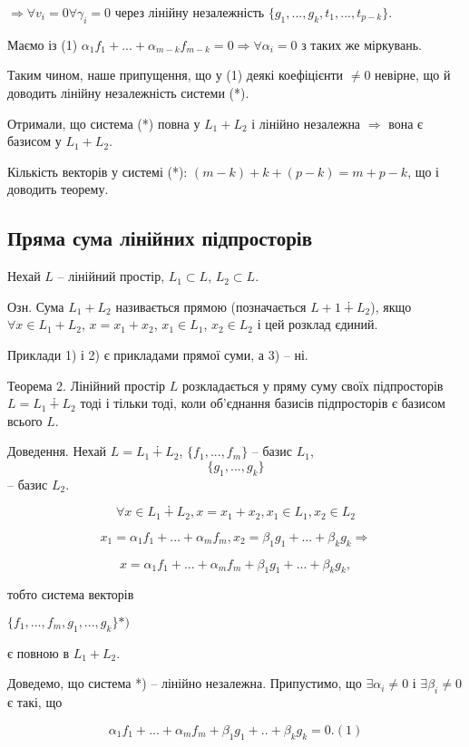 $\Rightarrow \forall v_i = 0 \forall \gamma_i = 0$
через лінійну незалежність $\{g_1, ..., g_k, t_1, ..., t_{p-k}\}$.

Маємо із (1) $\alpha_1 f_1 + ... + \alpha_{m-k} f_{m-k} = 0 \Rightarrow \forall \alpha_i = 0$ з
таких же міркувань.

Таким чином, наше припущення, що у (1) деякі коефіцієнти $\neq 0$ невірне,
що й доводить лінійну незалежність системи (*).

Отримали, що система (*) повна у $L_1 + L_2$ і лінійно незалежна $\Rightarrow$ вона є
базисом у $L_1 + L_2$.


Кількість векторів у системі (*): $(m - k) + k + (p - k) = m + p - k$,
що і доводить теорему. 

\subsection*{Пряма сума лінійних підпросторів}

Нехай $L$ -- лінійний простір, $L_1 \subset L$, $L_2 \subset L$.

Озн. Сума $L_1 + L_2$ називається прямою (позначається $L+1 \dotplus L_2$), якщо
$\forall x \in L_1 + L_2$, $x = x_1 + x_2$, $x_1 \in L_1$, $x_2 \in L_2$ і цей розклад єдиний.

Приклади 1) і 2) є прикладами прямої суми, а 3) -- ні.

Теорема 2. Лінійний простір $L$ розкладається у пряму суму своїх
підпросторів $L = L_1 \dotplus L_2$ тоді і тільки тоді, коли об’єднання базисів
підпросторів є базисом всього $L$.

Доведення. Нехай $L = L_1 \dotplus L_2$, $\{f_1, ..., f_m\}$ -- базис $L_1$, $$\{g_1, ..., g_k\}$$ -- базис
$L_2$.


$$\forall x \in L_1 \dotplus L_2, x = x_1 + x_2, x_1 \in L_1, x_2 \in L_2$$

$$x_1 = \alpha_1 f_1 + ... + \alpha_m f_m, x_2 = \beta_1 g_1 + ... + \beta_k g_k \Rightarrow$$

$$x = \alpha_1 f_1 + ... + \alpha_m f_m + \beta_1 g_1 + ... + \beta_k g_k,$$

тобто система векторів

$\{f_1, ..., f_m, g_1, ..., g_k\} *)$

є повною в $L_1 + L_2$.

Доведемо, що система *) -- лінійно незалежна. Припустимо, що
$\exists \alpha_i \neq 0$ і $\exists \beta_i \neq 0$ є такі, що

$$\alpha_1 f_1 + ... + \alpha_m f_m + \beta_1 g_1 + .. + \beta_k g_k = 0. (1)$$

